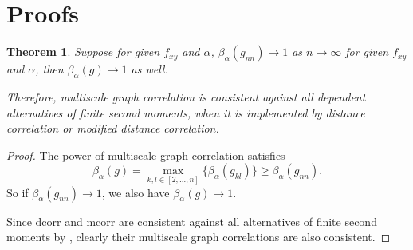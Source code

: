 \documentclass[11pt]{article}
\newtheorem{appThm}{Theorem}
\begin{document}
\section{Proofs}
\label{appen:proofs}


\begin{appThm}
Suppose for given $f_{xy}$ and $\alpha$, $\beta_{\alpha}(g_{nn}) \rightarrow 1$ as $n \rightarrow \infty$ for given $f_{xy}$ and $\alpha$, then $\beta_{\alpha}(g) \rightarrow 1$ as well.

Therefore, multiscale graph correlation is consistent against all dependent alternatives of finite second moments, when it is implemented by distance correlation or modified distance correlation.
\end{appThm}
\begin{proof}
The power of multiscale graph correlation satisfies
\begin{equation}
\beta_{\alpha}(g)=\max_{k,l \in [2,\ldots,n]}\{\beta_{\alpha}(g_{kl})\} \geq \beta_{\alpha}(g_{nn}).
\end{equation}
So if $\beta_{\alpha}(g_{nn}) \rightarrow 1$, we also have $\beta_{\alpha}(g) \rightarrow 1$.

Since dcorr and mcorr are consistent against all alternatives of finite second moments by \cite{SzekelyRizzoBakirov2007, SzekelyRizzo2013a}, clearly their multiscale graph correlations are also consistent.
\end{proof}
\end{document}
